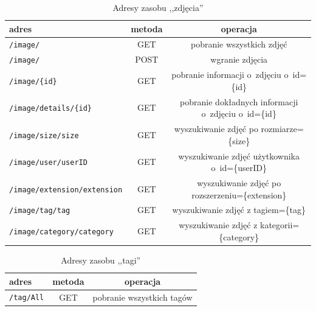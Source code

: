 \begin{table}[ht]
	\centering
	\caption{Adresy zasobu ,,zdjęcia''}
	\label{table:restImages}
 \begin{tabular}{|l|c|c|}
	\hline 
	adres & metoda & operacja  \\
	\hline 
	\texttt{/image/} & GET &  pobranie wszystkich zdjęć \\
	\hline 
    \texttt{/image/} & POST &  wgranie zdjęcia \\
    \hline 
	\texttt{/image/\{id\}} & GET & pobranie informacji o~zdjęciu o~id=\{id\} \\	
	\hline 
	\texttt{/image/details/\{id\}} & GET & pobranie dokładnych informacji o~zdjęciu o~id=\{id\} \\	
	\hline 
	\texttt{/image/size/{size}} & GET & wyszukiwanie zdjęć po rozmiarze=\{size\}\\
	\hline 
	\texttt{/image/user/{userID}} & GET & wyszukiwanie zdjęć użytkownika o~id=\{userID\} \\
    \hline 
    \texttt{/image/extension/{extension}} & GET & wyszukiwanie zdjęć po rozszerzeniu=\{extension\} \\
    \hline 
    \texttt{/image/tag/{tag}} & GET & wyszukiwanie zdjęć z tagiem=\{tag\}\\
    \hline 
    \texttt{/image/category/{category}} & GET & wyszukiwanie zdjęć z kategorii=\{category\}\\
    \hline 
\end{tabular}
\end{table}

\begin{table}[!ht]
\centering
\caption{Adresy zasobu ,,tagi''}
\label{table:restTags}
\begin{tabular}{|l|c|c|}
	\hline 
	adres & metoda & operacja  \\
	\hline
	\texttt{/tag/All} & GET & pobranie wszystkich tagów \\
	\hline
\end{tabular}
\end{table}

